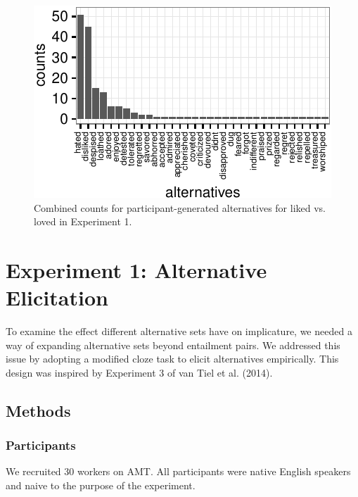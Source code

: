\documentclass[10pt, letterpaper]{article}
\newenvironment{CodeChunk}{}{}
\begin{document}
\begin{CodeChunk}
\begin{figure}[t]

{\centering \includegraphics{figs/exp2_altsPlot_likedLoved-1} 

}

\caption[Combined counts for participant-generated alternatives for liked vs]{Combined counts for participant-generated alternatives for liked vs. loved in Experiment 1.}\label{fig:exp2_altsPlot_likedLoved}
\end{figure}
\end{CodeChunk}

\section{Experiment 1: Alternative
Elicitation}\label{experiment-1-alternative-elicitation}

To examine the effect different alternative sets have on implicature, we
needed a way of expanding alternative sets beyond entailment pairs. We
addressed this issue by adopting a modified cloze task to elicit
alternatives empirically. This design was inspired by Experiment 3 of
{van Tiel} et al. (2014).

\subsection{Methods}\label{methods}

\subsubsection{Participants}\label{participants}

We recruited 30 workers on AMT. All participants were native English
speakers and naive to the purpose of the experiment.
\end{document}
